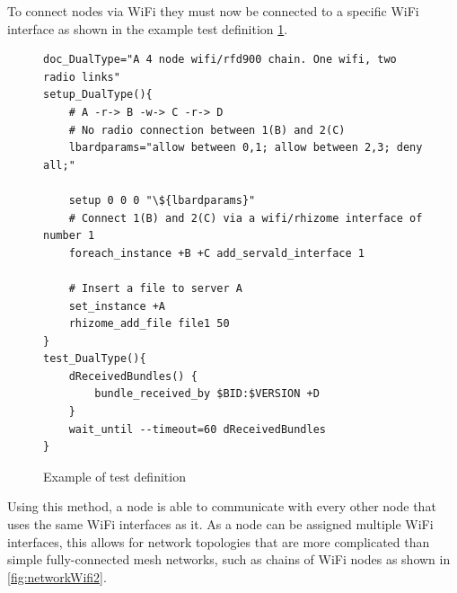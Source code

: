 To connect nodes via WiFi they must now be connected to a specific WiFi interface as shown in the example test definition \figurename{ \ref{fig:definingInterfaces}}.


\lstset{language=bash,
showstringspaces=false,
numbers=left,
}

\begin{figure}
    \begin{centering}
        \begin{lstlisting}[breaklines, frame=single]
doc_DualType="A 4 node wifi/rfd900 chain. One wifi, two radio links"
setup_DualType(){
    # A -r-> B -w-> C -r-> D
    # No radio connection between 1(B) and 2(C)
    lbardparams="allow between 0,1; allow between 2,3; deny all;"

    setup 0 0 0 "\${lbardparams}"
    # Connect 1(B) and 2(C) via a wifi/rhizome interface of number 1
    foreach_instance +B +C add_servald_interface 1

    # Insert a file to server A
    set_instance +A
    rhizome_add_file file1 50
}
test_DualType(){
    dReceivedBundles() {
        bundle_received_by $BID:$VERSION +D
    }
    wait_until --timeout=60 dReceivedBundles
}
        \end{lstlisting}
        \caption{Example of test definition}
        \label{fig:definingInterfaces}
    \end{centering}
\end{figure}

Using this method, a node is able to communicate with every other node that uses the same WiFi interfaces as it.
As a node can be assigned multiple WiFi interfaces, this allows for network topologies that are more complicated than simple fully-connected mesh networks, such as chains of WiFi nodes as shown in \figurename{ \ref{fig:networkWifi2}}.

